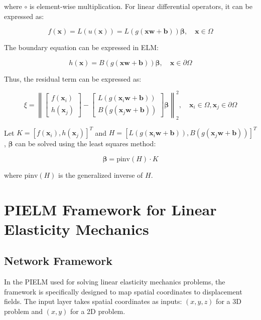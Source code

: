 \documentclass[11pt]{article}
\begin{document}
where $\circ$ is element-wise multiplication. For linear differential operators, it can be expressed as:

\begin{equation}
f(\mathbf{x}) = L(u(\mathbf{x})) = L(g(\mathbf{x}\mathbf{w} + \mathbf{b}))\boldsymbol{\beta}, \quad \mathbf{x} \in \Omega
\end{equation}

The boundary equation can be expressed in ELM:

\begin{equation}
h(\mathbf{x}) = B(g(\mathbf{x}\mathbf{w} + \mathbf{b}))\boldsymbol{\beta}, \quad \mathbf{x} \in \partial\Omega
\end{equation}

Thus, the residual term can be expressed as:

\begin{equation}
\xi = \left\| \begin{bmatrix} f(\mathbf{x}_i) \\ h(\mathbf{x}_j) \end{bmatrix} - \begin{bmatrix} L(g(\mathbf{x}_i\mathbf{w} + \mathbf{b})) \\ B(g(\mathbf{x}_j\mathbf{w} + \mathbf{b})) \end{bmatrix} \boldsymbol{\beta} \right\|^2_2, \quad \mathbf{x}_i \in \Omega, \mathbf{x}_j \in \partial\Omega
\end{equation}

Let $K = [f(\mathbf{x}_i), h(\mathbf{x}_j)]^T$ and $H = [L(g(\mathbf{x}_i\mathbf{w} + \mathbf{b})), B(g(\mathbf{x}_j\mathbf{w} + \mathbf{b}))]^T$, $\boldsymbol{\beta}$ can be solved using the least squares method:

\begin{equation}
\boldsymbol{\beta} = \text{pinv}(H) \cdot K
\end{equation}

where $\text{pinv}(H)$ is the generalized inverse of $H$.

\section{PIELM Framework for Linear Elasticity Mechanics}

\subsection{Network Framework}

In the PIELM used for solving linear elasticity mechanics problems, the framework is specifically designed to map spatial coordinates to displacement fields. The input layer takes spatial coordinates as inputs: $(x, y, z)$ for a 3D problem and $(x, y)$ for a 2D problem.
\end{document}
